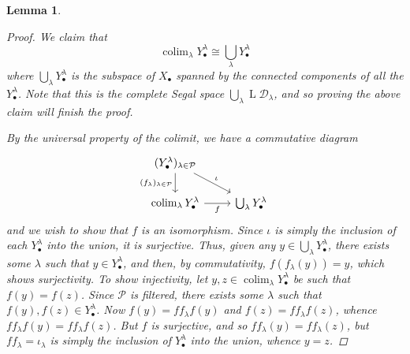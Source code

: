 \documentclass[11pt,fleqn]{article}
\theoremstyle{plain}
\newtheorem{lemma}[theorem]{Lemma}
\theoremstyle{definition}
\theoremstyle{remark}
\numberwithin{equation}{theorem}
\DeclareMathOperator{\LL}{L}
\DeclareMathOperator{\colim}{colim}
\begin{document}
\begin{lemma}
\begin{proof}
                We claim that
                \[
                    \colim_\lambda Y_\bullet^\lambda \cong \bigcup_\lambda Y_\bullet^\lambda
                \]
                where $\bigcup_\lambda Y_\bullet^\lambda$ is the subspace of $X_\bullet$ spanned by the connected components of all the $Y_\bullet^\lambda$.
                Note that this is the complete Segal space $\bigcup_\lambda\LL{\mathcal{D}_\lambda}$, and so proving the above claim will finish the proof.

                By the universal property of the colimit, we have a commutative diagram
                \[
                    \begin{tikzcd}
                        (Y_\bullet^\lambda)_{\lambda\in\mathcal{P}}
                            \ar[d,swap,"(f_\lambda)_{\lambda\in\mathcal{P}}"]
                            \ar[dr,"\iota"]
                    \\  \colim_\lambda Y_\bullet^\lambda
                            \ar[r,swap,"f"]
                        & \bigcup_\lambda Y_\bullet^\lambda
                    \end{tikzcd}
                \]
                and we wish to show that $f$ is an isomorphism.
                Since $\iota$ is simply the inclusion of each $Y_\bullet^\lambda$ into the union, it is surjective.
                Thus, given any $y\in\bigcup_\lambda Y_\bullet^\lambda$, there exists some $\lambda$ such that $y\in Y_\bullet^\lambda$, and then, by commutativity, $f(f_\lambda(y))=y$, which shows surjectivity.
                To show injectivity, let $y,z\in\colim_\lambda Y_\bullet^\lambda$ be such that $f(y)=f(z)$.
                Since $\mathcal{P}$ is filtered, there exists some $\lambda$ such that $f(y),f(z)\in Y_\bullet^\lambda$.
                Now $f(y)=ff_\lambda f(y)$ and $f(z)=ff_\lambda f(z)$, whence $ff_\lambda f(y)=ff_\lambda f(z)$.
                But $f$ is surjective, and so $ff_\lambda(y)=ff_\lambda(z)$, but $ff_\lambda=\iota_\lambda$ is simply the inclusion of $Y_\bullet^\lambda$ into the union, whence $y=z$.
            \end{proof}
        \end{lemma}
\end{document}
